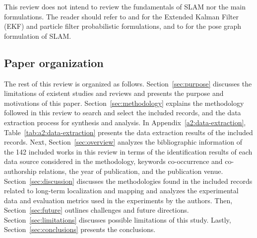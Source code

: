 This review does not intend to review the fundamentals of SLAM nor the main formulations. The reader should refer to \cite{purpose:study:durrant-whyte-bailey:2006:1} and \cite{purpose:study:durrant-whyte-bailey:2006:2} for the Extended Kalman Filter (EKF) and particle filter probabilistic formulations, and to \cite{purpose:study:grisetti:2010} for the pose graph formulation of SLAM.





\subsection{Paper organization}

The rest of this review is organized as follows.
Section~\ref{sec:purpose} discusses the limitations of existent studies and reviews and presents the purpose and motivations of this paper.
Section~\ref{sec:methodology} explains the methodology followed in this review to search and select the included records, and the data extraction process for synthesis and analysis. In Appendix~\ref{a2:data-extraction}, Table~\ref{tab:a2:data-extraction} presents the data extraction results of the included records.
Next, Section~\ref{sec:overview} analyzes the bibliographic information of the 142 included works in this review in terms of the identification results of each data source considered in the methodology, keywords co-occurrence and co-authorship relations, the year of publication, and the publication venue.
Section~\ref{sec:discussion} discusses the methodologies found in the included records related to long-term localization and mapping and analyzes the experimental data and evaluation metrics used in the experiments by the authors.
Then, Section~\ref{sec:future} outlines challenges and future directions.
Section~\ref{sec:limitations} discusses possible limitations of this study.
Lastly, Section~\ref{sec:conclusions} presents the conclusions.
